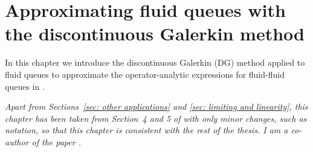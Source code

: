 \chapter{Approximating fluid queues with the discontinuous Galerkin method\label{ch:galerkin}} 

In this chapter we introduce the discontinuous Galerkin (DG) method applied to fluid queues to approximate the operator-analytic expressions for fluid-fluid queues in \cite{bo2014}. 
\begin{center}
	\begin{minipage}{0.8\textwidth}
		\textit{Apart from Sections~\ref{sec: other applications} and \ref{sec: limiting and linearity}, this chapter has been taken from Section~4 and 5 of \cite{blnos2022} with only minor changes, such as notation, so that this chapter is consistent with the rest of the thesis. I am a co-author of the paper \cite{blnos2022}. %
		}
	\end{minipage}
	\end{center}


